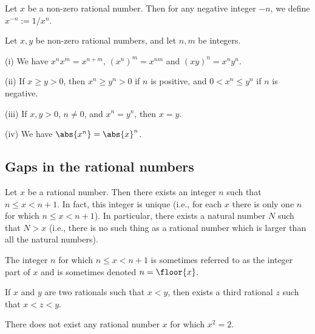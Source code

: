 \begin{definition}\label{def:exponentiation_negative_integer}
Let $x$ be a non-zero rational number. Then for any negative integer $-n$, we define $x^{-n} := 1/x^n $.
\end{definition}

\begin{proposition}
Let $x,y$ be non-zero rational numbers, and let $n,m$ be integers.
\ben
\item [(i)] We have $x^nx^m = x^{n+m}$, $(x^n)^m = x^{nm}$ and $(xy)^n = x^ny^n$.
\item [(ii)] If $x\geq y > 0$, then $x^n \geq y^n > 0$ if $n$ is positive, and $0<x^n \leq y^n$ if $n$ is negative.
\item [(iii)] If $x,y >0$, $n\neq 0$, and $x^n = y^n$, then $x=y$.
\item [(iv)] We have $\abs{x^n} = \abs{x}^n$.
\een
\end{proposition}

\subsection{Gaps in the rational numbers}

\begin{proposition}
Let $x$ be a rational number. Then there exists an integer $n$ such that $n\leq x< n+1$. In fact, this integer is unique (i.e., for each $x$ there is only one $n$ for which $n\leq x<n+1$). In particular, there exists a natural number $N$ such that $N>x$ (i.e., there is no such thing as a rational number which is larger than all the natural numbers).

The integer $n$ for which $n\leq x < n+1$ is sometimes referred to as the integer part of $x$ and is sometimes denoted $n=\floor{x}$.
\end{proposition}

\begin{proposition}
If $x$ and $y$ are two rationals such that $x<y$, then exists a third rational $z$ such that $x<z<y$.
\end{proposition}

\begin{proposition}
There does not exist any rational number $x$ for which $x^2 = 2$.
\end{proposition}

